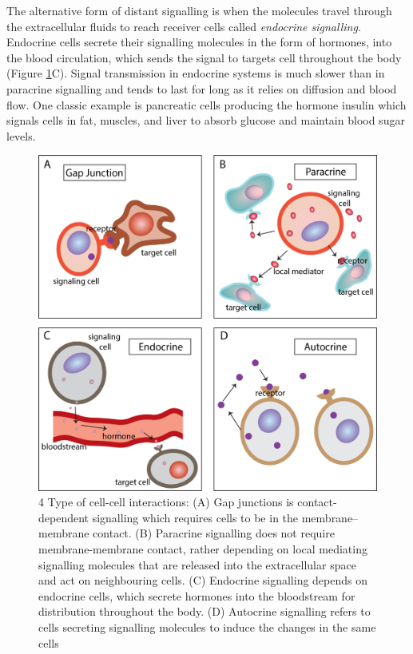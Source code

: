 The alternative form of distant signalling is when the molecules travel through the extracellular fluids to reach receiver cells called \textit{endocrine signalling}. Endocrine cells secrete their signalling molecules in the form of hormones, into the blood circulation, which sends the signal to targets cell throughout the body (Figure \ref{fig:Chap1_figure2}C). Signal transmission in endocrine systems is much slower than in paracrine signalling and tends to last for long as it relies on diffusion and blood flow. One classic example is pancreatic cells producing the hormone insulin which signals cells in fat, muscles, and liver to absorb glucose and maintain blood sugar levels.

\begin{figure}[htp]
    \centering
    \includegraphics[width=0.8\columnwidth]{Chapter1/Figures/Chap1_figure2.png}
    \caption[4 Type of cell-cell interactions]{4 Type of cell-cell interactions: (A) Gap junctions is contact-dependent signalling which requires cells to be in the membrane–membrane contact. (B) Paracrine signalling does not require membrane-membrane contact, rather depending on local mediating signalling molecules that are released into the extracellular space and act on neighbouring cells. (C) Endocrine signalling depends on endocrine cells, which secrete hormones into the bloodstream for distribution throughout the body. (D) Autocrine signalling refers to cells secreting signalling molecules to induce the changes in the same cells}
    \label{fig:Chap1_figure2}
\end{figure}

